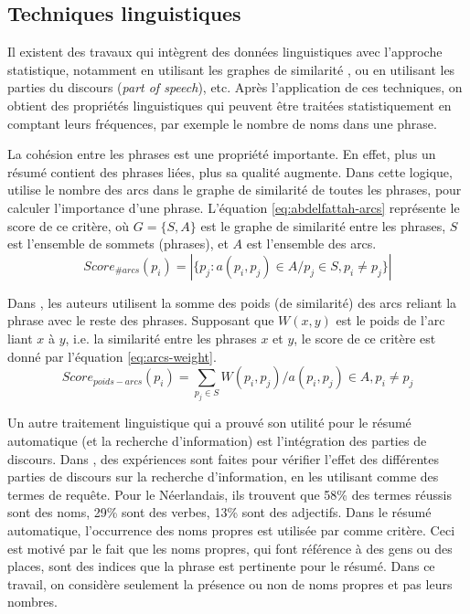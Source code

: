 \documentclass[a4paper,12pt,oneside]{../use/ESIthesis}
\begin{document}
\subsection{Techniques linguistiques}

Il existent des travaux qui intègrent des données linguistiques avec l'approche statistique, notamment en utilisant les graphes de similarité \cite{02-neto-al,09-abdelfattah-ren}, ou en utilisant les parties du discours (\textit{part of speech})\cite{96-kraaij-pohlmann,02-neto-al}, etc.
Après l'application de ces techniques, on obtient des propriétés linguistiques qui peuvent être traitées statistiquement en comptant leurs fréquences, par exemple le nombre de noms dans une phrase.

La cohésion entre les phrases est une propriété importante.
En effet, plus un résumé contient des phrases liées, plus sa qualité augmente. 
Dans cette logique, \cite{09-abdelfattah-ren} utilise le nombre des arcs dans le graphe de similarité de toutes les phrases, pour calculer l'importance d'une phrase. 
L'équation \ref{eq:abdelfattah-arcs} représente le score de ce critère, où $ G =  \{S, A\} $ est le graphe de similarité entre les phrases, $ S $ est l'ensemble de sommets (phrases), et $ A $ est l'ensemble des arcs.
\begin{equation}
\label{eq:abdelfattah-arcs}
Score_{\#arcs}(p_i) = |\{ p_j : a(p_i, p_j) \in A / p_j \in S, p_i \neq p_j \}|
\end{equation}

Dans \cite{02-neto-al}, les auteurs utilisent la somme des poids (de similarité) des arcs reliant la phrase avec le reste des phrases. 
Supposant que $ W(x, y) $ est le poids de l'arc liant $ x $ à $ y $, i.e. la similarité entre les phrases $ x $ et $ y $, le score de ce critère est donné par l'équation \ref{eq:arcs-weight}.
\begin{equation}
\label{eq:arcs-weight}
Score_{poids-arcs}(p_i) = \sum_{p_j \in S} W(p_i, p_j) / a(p_i, p_j) \in A , p_i \neq p_j
\end{equation}

Un autre traitement linguistique qui a prouvé son utilité pour le résumé automatique (et la recherche d'information) est l'intégration des parties de discours. 
Dans \cite{96-kraaij-pohlmann}, des expériences sont faites pour vérifier l'effet des différentes parties de discours sur la recherche d'information, en les utilisant comme des termes de requête. 
Pour le Néerlandais, ils trouvent que 58\% des termes réussis sont des noms, 29\% sont des verbes, 13\% sont des adjectifs. 
Dans le résumé automatique, l'occurrence des noms propres est utilisée par \cite{02-neto-al} comme critère. 
Ceci est motivé par le fait que les noms propres, qui font référence à des gens ou des places, sont des indices que la phrase est pertinente pour le résumé.
Dans ce travail, on considère seulement la présence ou non de noms propres et pas leurs nombres. 
\end{document}
